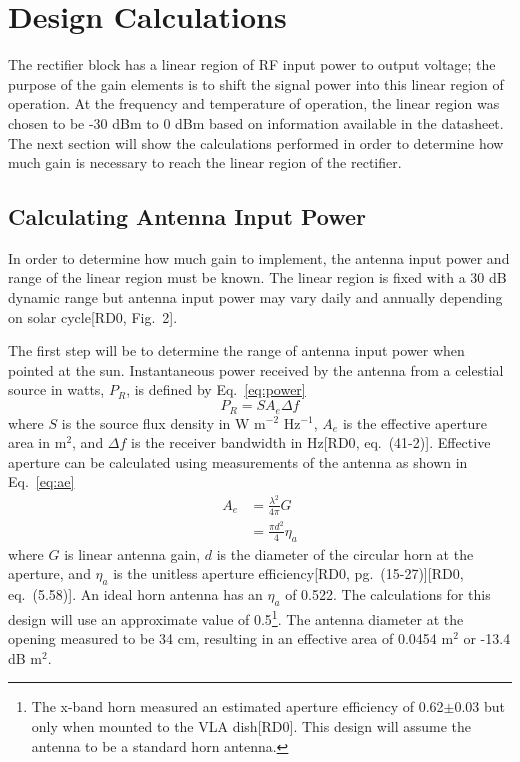 \documentclass[titlepage]{article}
\newcommand{\nraocite}[1]{[RD0\cite{#1}]}
\newcommand{\nraoprecite}[2][]{[RD0\cite{#2}{, #1}]}
\begin{document}
\section{Design Calculations}
The rectifier block has a linear region of RF input power to output voltage; the purpose of the gain elements is to shift the signal power into this linear region of operation. At the frequency and temperature of operation, the linear region was chosen to be -30 dBm to 0 dBm based on information available in the datasheet. The next section will show the calculations performed in order to determine how much gain is necessary to reach the linear region of the rectifier.


\subsection{Calculating Antenna Input Power}
In order to determine how much gain to implement, the antenna input power and range of the linear region must be known. The linear region is fixed with a 30 dB dynamic range but antenna input power may vary daily and annually depending on solar cycle\nraoprecite[Fig.~2]{solartemp}.

The first step will be to determine the range of antenna input power when pointed at the sun. Instantaneous power received by the antenna from a celestial source in watts, $P_R$, is defined by Eq.~\ref{eq:power}
\begin{equation}
    P_R = S A_e \Delta f
\label{eq:power}
\end{equation}
where $S$ is the source flux density in W m$^{-2}$ Hz$^{-1}$, $A_e$ is the effective aperture area in m$^2$, and $\Delta f$ is the receiver bandwidth in Hz\nraoprecite[eq.~(41-2)]{aeh}. Effective aperture can be calculated using measurements of the antenna as shown in Eq.~\ref{eq:ae}
\begin{equation} \label{eq:ae}
\begin{split}
    A_e &= \frac{\lambda^2}{4\pi}G \\
    &= \frac{\pi d^2}{4} \eta_a
\end{split}
\end{equation}
where $G$ is linear antenna gain, $d$ is the diameter of the circular horn at the aperture, and $\eta_a$ is the unitless aperture efficiency\nraoprecite[pg.~(15-27)]{aeh}\nraoprecite[eq.~(5.58)]{tora}. An ideal horn antenna has an $\eta_a$ of 0.522. The calculations for this design will use an approximate value of 0.5\footnote{The x-band horn measured an estimated aperture efficiency of 0.62$\pm$0.03 but only when mounted to the VLA dish\nraocite{xbandvla}. This design will assume the antenna to be a standard horn antenna.}. The antenna diameter at the opening measured to be 34 cm, resulting in an effective area of 0.0454 m$^2$ or -13.4 dB m$^2$.
\end{document}

